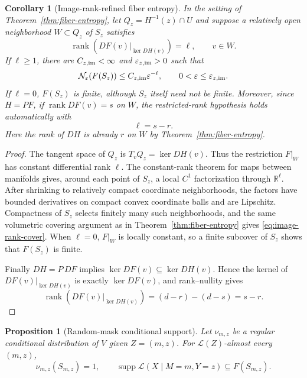 \documentclass[11pt]{article}
\newtheorem{proposition}[theorem]{Proposition}
\newtheorem{corollary}[theorem]{Corollary}
\theoremstyle{definition}
\newcommand{\R}{\mathbb R}
\newcommand{\cN}{\mathcal N}
\newcommand{\supp}{\operatorname{supp}}
\newcommand{\rank}{\operatorname{rank}}
\begin{document}
\begin{corollary}[Image-rank-refined fiber entropy]
\label{cor:image-rank-entropy}
In the setting of Theorem~\ref{thm:fiber-entropy}, let
$Q_z=H^{-1}(z)\cap U$ and suppose a relatively open neighborhood
$W\subset Q_z$ of $S_z$ satisfies
\[
 \rank\!\left(DF(v)|_{\ker DH(v)}\right)=\ell,
 \qquad v\in W.
\]
If $\ell\ge1$, there are $C_{z,\rm im}<\infty$ and
$\varepsilon_{z,\rm im}>0$ such that
\begin{equation}\label{eq:image-rank-cover}
 \cN_\varepsilon(F(S_z))\le C_{z,\rm im}\varepsilon^{-\ell},
 \qquad 0<\varepsilon\le\varepsilon_{z,\rm im}.
\end{equation}
If $\ell=0$, $F(S_z)$ is finite, although $S_z$ itself need not be finite.
Moreover, since $H=PF$, if $\rank DF(v)=s$ on $W$, the restricted-rank
hypothesis holds automatically with
\begin{equation}\label{eq:image-rank-difference}
 \ell=s-r.
\end{equation}
Here the rank of $DH$ is already $r$ on $W$ by
Theorem~\ref{thm:fiber-entropy}.
\end{corollary}

\begin{proof}
The tangent space of $Q_z$ is $T_vQ_z=\ker DH(v)$.  Thus the restriction
$F|_W$ has constant differential rank $\ell$.  The constant-rank theorem for
maps between manifolds gives, around each point of $S_z$, a local $C^1$
factorization through $\R^\ell$.  After shrinking to relatively compact
coordinate neighborhoods, the factors have bounded derivatives on compact
convex coordinate balls and are Lipschitz.  Compactness of $S_z$ selects
finitely many such neighborhoods, and the same volumetric covering argument
as in Theorem~\ref{thm:fiber-entropy} gives \eqref{eq:image-rank-cover}.  When
$\ell=0$, $F|_W$ is locally constant, so a finite subcover of $S_z$ shows that
$F(S_z)$ is finite.

Finally $DH=P\,DF$ implies $\ker DF(v)\subseteq\ker DH(v)$.  Hence the kernel
of $DF(v)|_{\ker DH(v)}$ is exactly $\ker DF(v)$, and rank--nullity gives
\[
 \rank\!\left(DF(v)|_{\ker DH(v)}\right)
 =(d-r)-(d-s)=s-r.
\]
\end{proof}

\begin{proposition}[Random-mask conditional support]
\label{prop:conditional-support}
Let $\nu_{m,z}$ be a regular conditional distribution of $V$ given
$Z=(m,z)$.  For $\mathcal L(Z)$-almost every $(m,z)$,
\[
 \nu_{m,z}(S_{m,z})=1,
 \qquad
 \supp\mathcal L(X\mid M=m,Y=z)\subseteq F(S_{m,z}).
\]
\end{proposition}
\end{document}
